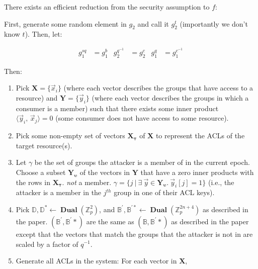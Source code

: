 \documentclass[pdftex,12pt,a4papaer,twoside,notitlepage]{report}
\DeclareMathOperator{\dual}{\mathbf{Dual}}
\newcommand{\iprod}[2]{\langle #1,\,#2\rangle}
\begin{document}
\begin{appendices}
There exists an efficient reduction from the security assumption to $f$:

First, generate some random element in $g_2$ and call it $g_2^t$ (importantly we
don't know $t$). Then, let:

\begin{align*}
  g_1^{sq} &= g_1^b & g_2^{q^{-1}} &= g_2^c & g_1^{q} &= g_1^{c^{-1}}
\end{align*}

Then: \\

\begin{enumerate}
\item Pick $\mathbf{X} = \{\vec{x}_i\}$ (where each vector describes the groups
  that have access to a resource) and $\mathbf{Y} = \{\vec{y}_i\}$ (where each
  vector describes the groups in which a consumer is a member) 
  such that there exists some inner product $\iprod{\vec{y}_i}{\vec{x}_j} = 0$
  (some consumer does not have access to some resource).
\item Pick some non-empty set of vectors $\mathbf{X_\tau}$ of
  $\mathbf{X}$ to represent the ACLs of the target resource(s).
\item Let $\gamma$ be the set of groups the attacker is a member of in the
  current epoch. Choose a subset $\mathbf{Y_{\upsilon}}$ of the vectors in
  $\mathbf{Y}$ that have a zero inner products with the rows in
  $\mathbf{X_\tau}$. \emph{not} a member. $\gamma = \{ j ~ | ~ \exists~\vec{y}
  \in \mathbf{Y_\upsilon}.~\vec{y}_i[j] = 1 \}$ (i.e., the attacker is a member
  in the $j^{\mathit{th}}$ group in one of their ACL keys).
\item Pick $\mathbb{D}, \mathbb{D^*} \leftarrow
  \dual(\mathbb{Z}_p^2)$, and $\mathbb{B^\prime}, \mathbb{B^{\prime *}} \leftarrow
  \dual(\mathbb{Z}_p^{2n+4})$ as described in the paper. 
  $(\mathbb{B^\prime}, \mathbb{B^\prime *})$ are the same as $(\mathbb{B},
  \mathbb{B^\prime *})$ as described in the paper except that the vectors that
  match the groups that the attacker is not in are scaled by a factor of
  $q^{-1}$.
\item Generate all ACLs in the system: For each vector in $\mathbf{X}$,


\end{enumerate}
\end{appendices}
\end{document}
